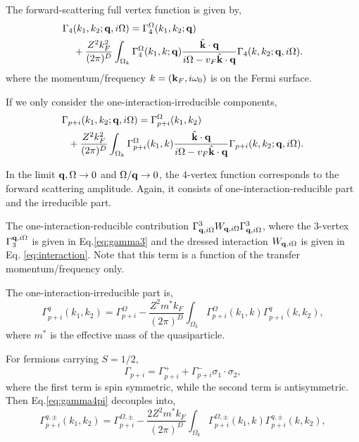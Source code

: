 \documentclass[reprint,amsmath,amssymb,aps,prb]{revtex4-1}
\begin{document}
The forward-scattering full vertex function is given by,
\begin{align}
    \Gamma_4 & (k_1, k_2; \mathbf{q}, i\Omega)=\Gamma_4^\Omega(k_1, k_2; \mathbf{q}) \nonumber \\&
    +\frac{Z^2k_F^2}{(2\pi)^D} \int_{\Omega_k} \Gamma_4^\Omega(k_1, k; \mathbf{q})\frac{\hat{\mathbf{k}}\cdot \mathbf{q}}{i\Omega-v_F \hat{\mathbf{k}}\cdot \mathbf{q}}\Gamma_4(k, k_2; \mathbf{q}, i\Omega).
\end{align}
where the momentum/frequency $k=(\mathbf{k}_F, i\omega_0)$ is on the Fermi surface.

If we only consider the one-interaction-irreducible components,
\begin{align}
    \Gamma & _{p+i}(k_1, k_2; \mathbf{q}, i\Omega)=\Gamma_{p+i}^\Omega(k_1, k_2) \nonumber                                                                                             \\
           & +\frac{Z^2k_F^2}{(2\pi)^D} \int_{\Omega_k} \Gamma_{p+i}^\Omega(k_1, k)\frac{\hat{\mathbf{k}}\cdot \mathbf{q}}{i\Omega-v_F \hat{\mathbf{k}}\cdot \mathbf{q}}\Gamma_{p+i}(k, k_2; \mathbf{q}, i\Omega).
\end{align}

In the limit $\mathbf{q}, \Omega\rightarrow 0$ and $\Omega/\mathbf{q} \rightarrow 0$, the $4$-vertex function corresponds to the forward scattering amplitude. Again, it consists of one-interaction-reducible part and the irreducible part.

The one-interaction-reducible contribution $\Gamma^3_{\mathbf{q}, i\Omega} W_{\mathbf{q}, i\Omega} \Gamma^3_{\mathbf{q}, i\Omega}$, where the $3$-vertex $\Gamma_3^{\mathbf{q}, i\Omega}$ is given in Eq.\eqref{eq:gamma3} and the dressed interaction $W_{\mathbf{q}, i\Omega}$ is given in Eq. \ref{eq:interaction}. Note that this term is a function of the transfer momentum/frequency only.

The one-interaction-irreducible part is,
\begin{equation}
    \label{eq:gamma4pi}
    \Gamma_{p+i}^q(k_1, k_2)=\Gamma_{p+i}^\Omega-\frac{Z^2m^* k_F}{(2\pi)^D} \int_{\Omega_k} \Gamma_{p+i}^\Omega(k_1, k)\Gamma_{p+i}^q(k, k_2),
\end{equation}
where $m^*$ is the effective mass of the quasiparticle.

For fermions carrying $S=1/2$,
\begin{equation}
    \Gamma_{p+i}=\Gamma_{p+i}^{+}+\Gamma_{p+i}^{-}\sigma_1\cdot\sigma_2,
\end{equation}
where the first term is spin symmetric, while the second term is antisymmetric. Then Eq.\eqref{eq:gamma4pi} decouples into,
\begin{equation}
    \label{eq:gamma4pi_spin}
    \Gamma_{p+i}^{q,\pm}(k_1, k_2)=\Gamma_{p+i}^{\Omega,\pm}-\frac{2 Z^2m^* k_F}{(2\pi)^D} \int_{\Omega_k} \Gamma_{p+i}^{\Omega,\pm}(k_1, k)\Gamma_{p+i}^{q,\pm}(k, k_2),
\end{equation}
\end{document}
